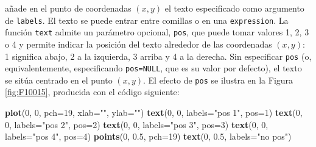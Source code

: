 \documentclass[
]{book}
\newenvironment{Shaded}{\begin{snugshade}}{\end{snugshade}}
\newcommand{\DataTypeTok}[1]{\textcolor[rgb]{0.13,0.29,0.53}{#1}}
\newcommand{\DecValTok}[1]{\textcolor[rgb]{0.00,0.00,0.81}{#1}}
\newcommand{\FloatTok}[1]{\textcolor[rgb]{0.00,0.00,0.81}{#1}}
\newcommand{\KeywordTok}[1]{\textcolor[rgb]{0.13,0.29,0.53}{\textbf{#1}}}
\newcommand{\NormalTok}[1]{#1}
\newcommand{\StringTok}[1]{\textcolor[rgb]{0.31,0.60,0.02}{#1}}
\theoremstyle{definition}
\theoremstyle{definition}
\theoremstyle{definition}
\theoremstyle{remark}
\begin{document}
añade en el punto de coordenadas \((x, y)\) el texto especificado como argumento de \texttt{labels}. El texto se puede entrar entre comillas o en una \texttt{expression}. La función \texttt{text} admite un parámetro opcional, \texttt{pos}, que puede tomar valores 1, 2, 3 o 4 y permite indicar la posición del texto alrededor de las coordenadas \((x, y)\): 1 significa abajo, 2 a la izquierda, 3 arriba y 4 a la derecha. Sin especificar \texttt{pos} (o, equivalentemente, especificando \texttt{pos=NULL}, que es su valor por defecto), el texto se sitúa centrado en el punto \((x, y)\). El efecto de \texttt{pos} se ilustra en la Figura \ref{fig:F10015}, producida con el código siguiente:

\begin{Shaded}
\begin{Highlighting}[]
\KeywordTok{plot}\NormalTok{(}\DecValTok{0}\NormalTok{, }\DecValTok{0}\NormalTok{, }\DataTypeTok{pch=}\DecValTok{19}\NormalTok{, }\DataTypeTok{xlab=}\StringTok{""}\NormalTok{, }\DataTypeTok{ylab=}\StringTok{""}\NormalTok{)}
\KeywordTok{text}\NormalTok{(}\DecValTok{0}\NormalTok{, }\DecValTok{0}\NormalTok{, }\DataTypeTok{labels=}\StringTok{"pos 1"}\NormalTok{, }\DataTypeTok{pos=}\DecValTok{1}\NormalTok{)}
\KeywordTok{text}\NormalTok{(}\DecValTok{0}\NormalTok{, }\DecValTok{0}\NormalTok{, }\DataTypeTok{labels=}\StringTok{"pos 2"}\NormalTok{, }\DataTypeTok{pos=}\DecValTok{2}\NormalTok{)}
\KeywordTok{text}\NormalTok{(}\DecValTok{0}\NormalTok{, }\DecValTok{0}\NormalTok{, }\DataTypeTok{labels=}\StringTok{"pos 3"}\NormalTok{, }\DataTypeTok{pos=}\DecValTok{3}\NormalTok{)}
\KeywordTok{text}\NormalTok{(}\DecValTok{0}\NormalTok{, }\DecValTok{0}\NormalTok{, }\DataTypeTok{labels=}\StringTok{"pos 4"}\NormalTok{, }\DataTypeTok{pos=}\DecValTok{4}\NormalTok{)}
\KeywordTok{points}\NormalTok{(}\DecValTok{0}\NormalTok{, }\FloatTok{0.5}\NormalTok{, }\DataTypeTok{pch=}\DecValTok{19}\NormalTok{)}
\KeywordTok{text}\NormalTok{(}\DecValTok{0}\NormalTok{, }\FloatTok{0.5}\NormalTok{, }\DataTypeTok{labels=}\StringTok{"no pos"}\NormalTok{)}
\end{Highlighting}
\end{Shaded}
\end{document}
